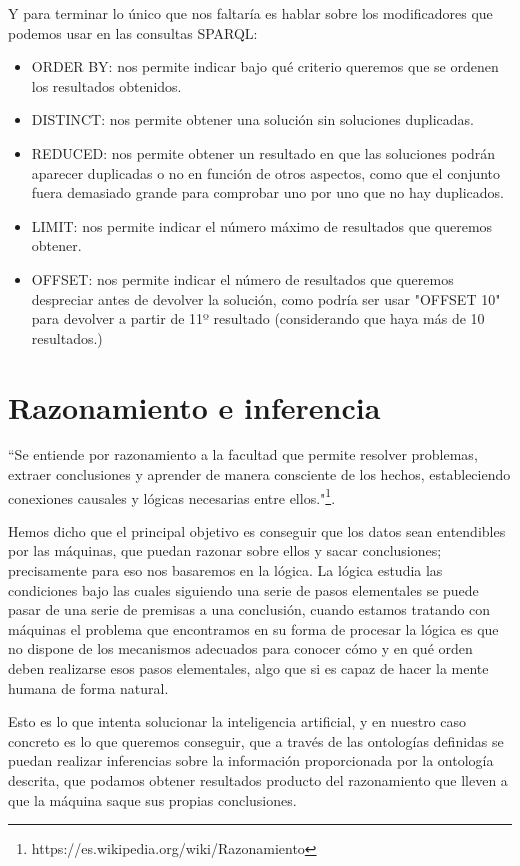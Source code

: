 Y para terminar lo único que nos faltaría es hablar sobre los modificadores que podemos usar en las consultas SPARQL:

\begin{itemize}
	\item ORDER BY: nos permite indicar bajo qué criterio queremos que se ordenen los resultados obtenidos.
	\item DISTINCT: nos permite obtener una solución sin soluciones duplicadas.
	\item REDUCED: nos permite obtener un resultado en que las soluciones podrán aparecer duplicadas o no en función de otros aspectos, como que el conjunto fuera demasiado grande para comprobar uno por uno que no hay duplicados.
	\item LIMIT: nos permite indicar el número máximo de resultados que queremos obtener.
	\item OFFSET: nos permite indicar el número de resultados que queremos despreciar antes de devolver la solución, como podría ser usar "OFFSET 10" para devolver a partir de 11º resultado (considerando que haya más de 10 resultados.)
\end{itemize}

\section{Razonamiento e inferencia}

``Se entiende por razonamiento a la facultad que permite resolver problemas, extraer conclusiones y aprender de manera consciente de los hechos, estableciendo conexiones causales y lógicas necesarias entre ellos."\footnote{https://es.wikipedia.org/wiki/Razonamiento}.

\bigskip
Hemos dicho que el principal objetivo es conseguir que los datos sean entendibles por las máquinas, que puedan razonar sobre ellos y sacar conclusiones; precisamente para eso nos basaremos en la lógica. La lógica estudia las condiciones bajo las cuales siguiendo una serie de pasos elementales se puede pasar de una serie de premisas a una conclusión, cuando estamos tratando con máquinas el problema que encontramos en su forma de procesar la lógica es que no dispone de los mecanismos adecuados para conocer cómo y en qué orden deben realizarse esos pasos elementales, algo que si es capaz de hacer la mente humana de forma natural. 

\bigskip
Esto es lo que intenta solucionar la inteligencia artificial, y en nuestro caso concreto es lo que queremos conseguir, que a través de las ontologías definidas se puedan realizar inferencias sobre la información proporcionada por la ontología descrita, que podamos obtener resultados producto del razonamiento que lleven a que la máquina saque sus propias conclusiones.


